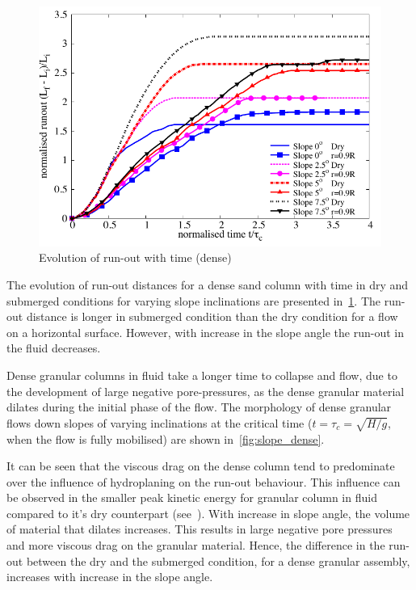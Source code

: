 \begin{figure}
\centering
\includegraphics[width=0.97\columnwidth]{Runout_dense}
\caption{Evolution of run-out with time (dense)}
\label{fig:run_dense}
\end{figure}

The evolution of run-out distances for a dense sand column with time in dry and submerged conditions for varying slope inclinations are presented in~\cref{fig:run_dense}. The run-out distance is longer in submerged condition than the dry condition for a flow on a horizontal surface. However, with increase in the slope angle the run-out in the fluid decreases.

Dense granular columns in fluid take a longer time to collapse and flow, due to the development of large negative pore-pressures, as the dense granular material dilates during the initial phase of the flow. The morphology of dense granular flows down slopes of varying inclinations at the critical time ($t=\tau_{c}=\sqrt{H/g}$, when the flow is fully mobilised) are shown in~\cref{fig:slope_dense}.

It can be seen that the viscous drag on the dense column tend to predominate over the influence of hydroplaning on the run-out behaviour. This influence can be observed in the smaller peak kinetic energy for granular column in fluid compared to it's dry counterpart (see~). With increase in slope angle, the volume of material that dilates increases. This results in large negative pore pressures and more viscous drag on the granular material. Hence, the difference in the run-out between the dry and the submerged condition, for a dense granular assembly, increases with increase in the slope angle.

